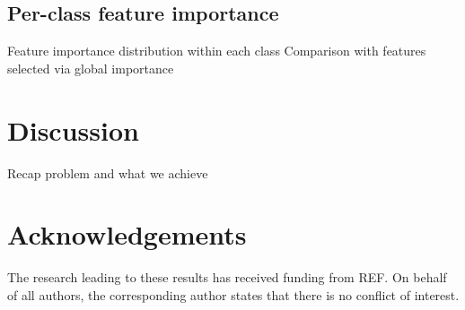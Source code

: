 \documentclass[12pt,a4paper]{article}
\theoremstyle{definition}
\theoremstyle{plain}
\theoremstyle{remark}
\begin{document}
\subsection{Per-class feature importance}\label{subsec:feature_selection}
Feature importance distribution within each class
Comparison with features selected via global importance

\section{Discussion}\label{sec:discussion}
Recap problem and what we achieve

\section*{Acknowledgements}
The research leading to these results has received funding from REF.
On behalf of all authors, the corresponding author states that there is no conflict of interest.


\end{document}
